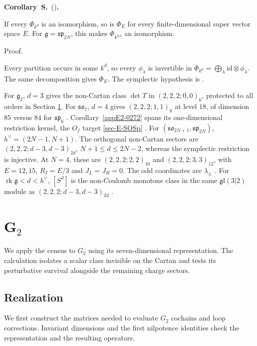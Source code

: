 \documentclass[11pt]{article}
\numberwithin{equation}{section}
\numberwithin{figure}{section}
\numberwithin{table}{section}
\newcounter{rthmc}[section]
\renewcommand{\therthmc}{\thesection.\arabic{rthmc}}
\newcommand{\rthm}[3]{\par\addvspace{\medskipamount}\noindent\refstepcounter{rthmc}\label{#2}\textbf{#1~\therthmc}\if\relax\detokenize{#3}\relax\else\ (#3)\fi\textbf{.}}
\renewcommand{\thesection}{S\arabic{section}}
\begin{document}
\rthm{Corollary}{appE2-0278}{}

If every $\Phi_{k^d}$ is an isomorphism, so is $\Phi_E$ for every finite-dimensional super vector space $E$. For $\mathfrak g=\mathfrak{sp}_{2N}$, this makes $\Phi_{k^{3|2}}$ an isomorphism.

\begin{proofbox}
Proof.

Every partition occurs in some $k^d$, so every $\phi_\lambda$ is invertible in $\Phi_{k^d}=\bigoplus_\lambda\mathrm{id}\otimes\phi_\lambda$. The same decomposition gives $\Phi_E$. The symplectic hypothesis is \cite[Theorem 4.1]{ChenNgoSp}.\hfill\qedsymbol
\end{proofbox}

For $\mathfrak g_2$, $d=3$ gives the non-Cartan class $\det T$ in $(2,2,2;0,0)_6$, protected to all orders in Section \ref{sec-E-G2}. For $\mathfrak{so}_7$, $d=4$ gives $(2,2,2;1,1)_8$ at level $18$, of dimension $85$ versus $84$ for $\mathfrak{sp}_6$ \cite[Section 3, Table 1]{ChangLin}. Corollary~\ref{appE2-0272} spans its one-dimensional restriction kernel, the $O_f$ target \ref{sec-E-SOSp} \cite[Theorem 1]{ChangChevalley}. For $(\mathfrak{so}_{2N+1},\mathfrak{sp}_{2N})$, $h^\vee=(2N-1,N+1)$. The orthogonal non-Cartan sectors are $(2,2,2;d-3,d-3)_{2d}$, $N+1\le d\le2N-2$, whereas the symplectic restriction is injective. At $N=4$, these are $(2,2,2;2,2)_{10}$ and $(2,2,2;3,3)_{12}$, with $E=12,15$, $R_I=E/3$ and $J_L=J_R=0$. The odd coordinates are $\lambda_\pm$ \cite[Section 2]{KvLM}. For $\operatorname{rk}\mathfrak g<d<h^\vee$, $[S^d]$ is the non-Coulomb monotone class in the same $\mathfrak{gl}(3|2)$ module as $(2,2,2;d-3,d-3)_{2d}$ \cite[Section 5]{KvLM}.

\section{G$_2$}\label{sec-E-G2}

We apply the census to $G_2$ using its seven-dimensional representation. The calculation isolates a scalar class invisible on the Cartan and tests its perturbative survival alongside the remaining charge sectors.

\subsection{Realization}\label{sec-E-G2-real}

We first construct the matrices needed to evaluate $G_2$ cochains and loop corrections. Invariant dimensions and the first nilpotence identities check the representation and the resulting operators.
\end{document}
